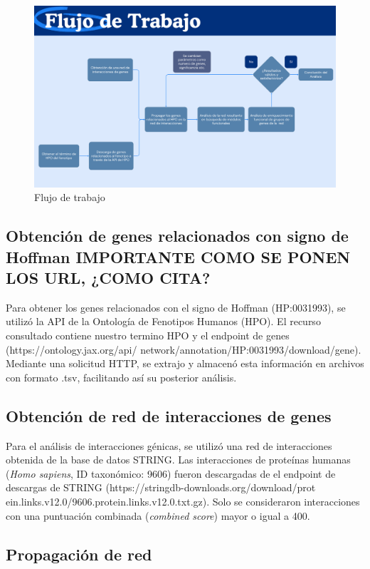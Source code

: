 \begin{figure}[h!]
	\includegraphics[width=.95\textwidth]{figures/workflow.png}
	\caption{Flujo de trabajo}
	\label{fig:workflow}
\end{figure}

\subsection{Obtención de genes relacionados con signo de Hoffman IMPORTANTE COMO SE PONEN LOS URL, ¿COMO CITA? }

Para obtener los genes relacionados con el signo de Hoffman (HP:0031993), se utilizó la API de la Ontología de Fenotipos Humanos (HPO). El recurso consultado contiene nuestro termino HPO y el endpoint de genes (https://ontology.jax.org/api/
network/annotation/HP:0031993/download/gene). Mediante una solicitud HTTP, se extrajo y almacenó esta información en archivos con formato .tsv, facilitando así su posterior análisis. 


\subsection{Obtención de red de interacciones de genes}

Para el análisis de interacciones génicas, se utilizó una red de interacciones obtenida de la base de datos STRING. Las interacciones de proteínas humanas (\textit{Homo sapiens}, ID taxonómico: 9606) fueron descargadas de el endpoint de descargas de STRING (https://stringdb-downloads.org/download/prot ein.links.v12.0/9606.protein.links.v12.0.txt.gz). Solo se consideraron interacciones con una puntuación combinada (\textit{combined score}) mayor o igual a 400.


\subsection{Propagación de red}

